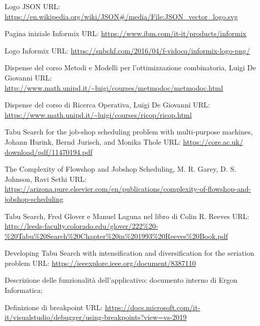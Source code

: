 \begin{enumerate}[label={[\arabic*]}]
    \item \label{jlogo} Logo JSON URL: \url{https://en.wikipedia.org/wiki/JSON#/media/File:JSON_vector_logo.svg}
    
    \item \label{informix} Pagina iniziale Informix URL: \url{https://www.ibm.com/it-it/products/informix}
    
    \item \label{ilogo} Logo Informix URL: \url{https://snbchf.com/2016/04/f-vidocq/informix-logo-png/}
    
    \item \label{slide} Dispense del corso Metodi e Modelli per l'ottimizzazione combinatoria, Luigi De Giovanni URL:
     \url{http://www.math.unipd.it/~luigi/courses/metmodoc/metmodoc.html}

     \item \label{slide0} Dispense del corso di Ricerca Operativa, Luigi De Giovanni URL:
     \url{https://www.math.unipd.it/~luigi/courses/ricop/ricop.html}
    
    \item \label{tabu} Tabu Search for the job-shop scheduling problem with multi-purpose machines,
    Johann Hurink, Bernd Jurisch, and Monika Thole URL: \url{https://core.ac.uk/
    download/pdf/11470194.pdf}

    \item \label{scheduling} The Complexity of Flowshop and Jobshop Scheduling, M. R. Garey, D. S. Johnson,
    Ravi Sethi URL: \url{https://arizona.pure.elsevier.com/en/publications/complexity-of-flowshop-and-jobshop-scheduling}

    \item \label{list} Tabu Search, Fred Glover e Manuel Laguna nel libro di Colin R. Reeves URL:  
    \url{http://leeds-faculty.colorado.edu/glover/222%20-%20Tabu%20Search%20Chapter%20in%201993%20Reeves%20Book.pdf}

    \item \label{criteria} Developing Tabu Search with intensification and diversification for the seriation problem URL: 
    \url{https://ieeexplore.ieee.org/document/8387110}

    \item \label{alert} Descrizione delle funzionalità dell'applicativo: documento interno di Ergon Informatica;
    
    \item \label{breakpoint} Definizione di breakpoint URL: \url{https://docs.microsoft.com/it-it/visualstudio/debugger/using-breakpoints?view=vs-2019}


\end{enumerate}

